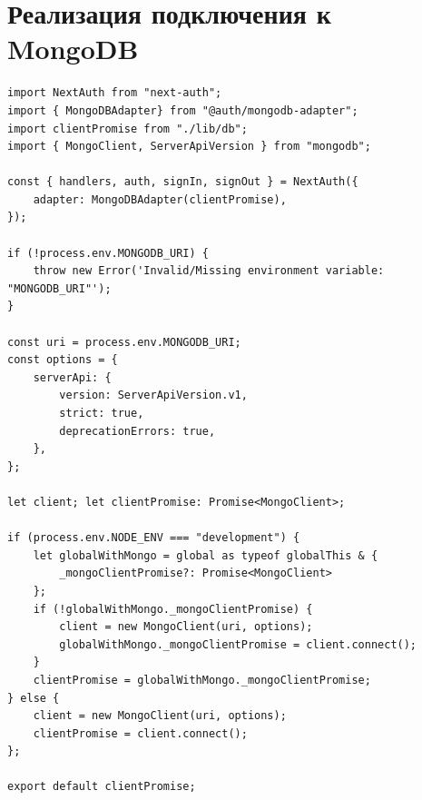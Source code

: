 \documentclass[master, och, diploma]{SCWorks}
\begin{document}
\section{Реализация подключения к MongoDB}
\begin{verbatim}
import NextAuth from "next-auth";
import { MongoDBAdapter} from "@auth/mongodb-adapter";
import clientPromise from "./lib/db";
import { MongoClient, ServerApiVersion } from "mongodb";

const { handlers, auth, signIn, signOut } = NextAuth({
    adapter: MongoDBAdapter(clientPromise),
});

if (!process.env.MONGODB_URI) {
    throw new Error('Invalid/Missing environment variable: "MONGODB_URI"');
}

const uri = process.env.MONGODB_URI;
const options = {
    serverApi: {
        version: ServerApiVersion.v1,
        strict: true,
        deprecationErrors: true,
    },
};

let client; let clientPromise: Promise<MongoClient>;
 
if (process.env.NODE_ENV === "development") {
    let globalWithMongo = global as typeof globalThis & {
        _mongoClientPromise?: Promise<MongoClient>
    };
    if (!globalWithMongo._mongoClientPromise) {
        client = new MongoClient(uri, options);
        globalWithMongo._mongoClientPromise = client.connect();
    }
    clientPromise = globalWithMongo._mongoClientPromise;
} else {
    client = new MongoClient(uri, options);
    clientPromise = client.connect();
};

export default clientPromise;
\end{verbatim}
\end{document}
